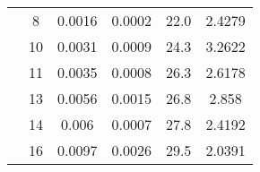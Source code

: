 \begin{table}[H]
\begin{tabular}{ccS[table-format=1.4]S[table-format=1.4]S[table-format=3.3]S[table-format=1.4]}
	& 8  & 0.0016 & 0.0002 & 22.0   & 2.4279 \\
	& 10 & 0.0031 & 0.0009 & 24.3   & 3.2622 \\
	& 11 & 0.0035 & 0.0008 & 26.3   & 2.6178 \\
	& 13 & 0.0056 & 0.0015 & 26.8   & 2.858  \\
	& 14 & 0.006  & 0.0007 & 27.8   & 2.4192 \\
	& 16 & 0.0097 & 0.0026 & 29.5   & 2.0391 \\
	\bottomrule
	\end{tabular}
\end{table}

